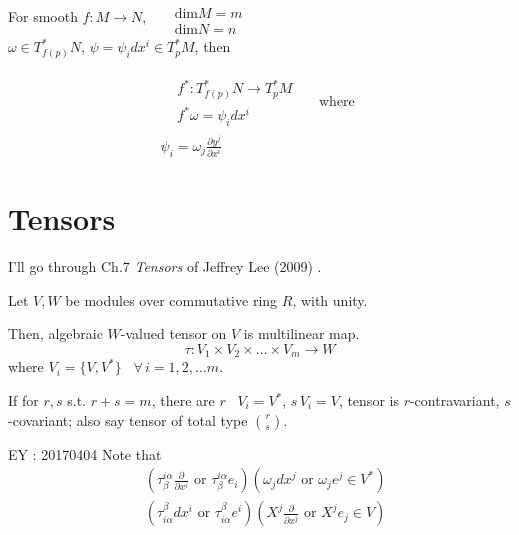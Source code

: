\begin{theorem}
For smooth $f: M \to N$, \quad \, $ \begin{aligned} & \quad \\ 
	& \text{dim}M = m \\ 
	& \text{dim} N = n \end{aligned}$ \\ 
$\omega \in T^*_{f(p)}N$, $\psi = \psi_i dx^i \in T^*_pM$, then 

\begin{equation}
	\boxed{ 
\begin{gathered} 
\begin{aligned}
& f^* : T^*_{f(p)}N \to T^*_p M \\
& f^* \omega = \psi_i dx^i
\end{aligned} \quad \, \text{ where }  \\
\psi_i = \omega_j \frac{ \partial y^j}{ \partial x^i} 
\end{gathered}
}
\end{equation}	
\end{theorem} 

\section{Tensors}

I'll go through Ch.7 \emph{Tensors} of Jeffrey Lee (2009) \cite{dgdt:JLee2009}.  

\begin{definition} Let $V,W$ be modules over commutative ring $R$, with unity.  

Then, algebraic $W$-valued tensor on $V$ is multilinear map.  
\begin{equation}
	\tau: V_1 \times V_2 \times \dots \times V_m \to W
\end{equation}
where $V_i = \lbrace V,V^* \rbrace$ \quad \, $ \forall \, i=1,2,\dots m$.  

If for $r,s$ s.t. $r+s =m$, there are $r$ \, $V_i = V^*$, $s \, V_i = V$, tensor is $r$-contravariant, $s$-covariant; also say tensor of total type $\binom{r}{s}$.  
\end{definition}

EY : 20170404 Note that 
\[
\begin{aligned}
	& ( \tau_{\beta}^{i\alpha} \frac{ \partial }{ \partial x^i } \text{ or } \tau_{\beta}^{i\alpha} e_i )(\omega_j dx^j \text{ or } \omega_je^j  \in V^*) \\ 
	& ( \tau^{\beta}_{i\alpha} dx^i \text{ or } \tau^{\beta}_{i\alpha} e^i )( X^j \frac{ \partial }{ \partial x^j} \text{ or } X^j e_j  \in V) 
\end{aligned}
\]

